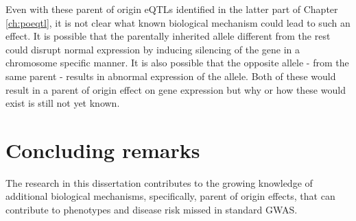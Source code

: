  Even with these parent of origin eQTLs identified in the latter part of Chapter \ref{ch:poeqtl}, it is not clear what known biological mechanism could lead to such an effect. It is possible that the parentally inherited allele different from the rest could disrupt normal expression by inducing silencing of the gene in a chromosome specific manner. It is also possible that the opposite allele - from the same parent - results in abnormal expression of the allele. Both of these would result in a parent of origin effect on gene expression but why or how these would exist is still not yet known. 

\section{Concluding remarks}

The research in this dissertation contributes to the growing knowledge of additional biological mechanisms, specifically, parent of origin effects, that can contribute to phenotypes and disease risk missed in standard GWAS.




